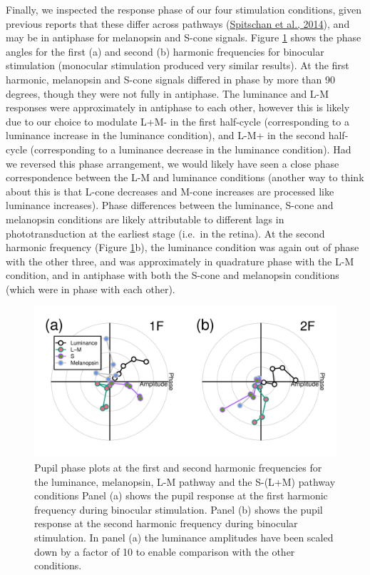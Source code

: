 \documentclass[
]{article}
\begin{document}
Finally, we inspected the response phase of our four stimulation conditions, given previous reports that these differ across pathways (\protect\hyperlink{ref-Spitschan2014}{Spitschan et al., 2014}), and may be in antiphase for melanopsin and S-cone signals. Figure \ref{fig:phaseplots} shows the phase angles for the first (a) and second (b) harmonic frequencies for binocular stimulation (monocular stimulation produced very similar results). At the first harmonic, melanopsin and S-cone signals differed in phase by more than 90 degrees, though they were not fully in antiphase. The luminance and L-M responses were approximately in antiphase to each other, however this is likely due to our choice to modulate L+M- in the first half-cycle (corresponding to a luminance increase in the luminance condition), and L-M+ in the second half-cycle (corresponding to a luminance decrease in the luminance condition). Had we reversed this phase arrangement, we would likely have seen a close phase correspondence between the L-M and luminance conditions (another way to think about this is that L-cone decreases and M-cone increases are processed like luminance increases). Phase differences between the luminance, S-cone and melanopsin conditions are likely attributable to different lags in phototransduction at the earliest stage (i.e.~in the retina). At the second harmonic frequency (Figure \ref{fig:phaseplots}b), the luminance condition was again out of phase with the other three, and was approximately in quadrature phase with the L-M condition, and in antiphase with both the S-cone and melanopsin conditions (which were in phase with each other).

\begin{figure}

{\centering \includegraphics{Figures/phaseplots} 

}

\caption{Pupil phase plots at the first and second harmonic frequencies for the luminance, melanopsin, L-M pathway and the S-(L+M) pathway conditions Panel (a) shows the pupil response at the first harmonic frequency during binocular stimulation. Panel (b) shows the pupil response at the second harmonic frequency during binocular stimulation. In panel (a) the luminance amplitudes have been scaled down by a factor of 10 to enable comparison with the other conditions.}\label{fig:phaseplots}
\end{figure}
\end{document}
